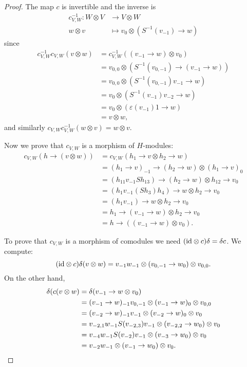 \begin{proof}
The map $c$ is invertible and the inverse is 
\begin{align*}
c_{V,W}^{-1}:W\otimes V & \to V\otimes W\\
w\otimes v & \mapsto v_{0}\otimes(S^{-1}(v_{-1})\to w)
\end{align*}
since
\begin{align*}
c_{V,W}^{-1}c_{V,W}(v\otimes w) & =c_{V,W}^{-1}((v_{-1}\to w)\otimes v_{0})\\
 & =v_{0,0}\otimes(S^{-1}(v_{0,-1})\to(v_{-1}\to w))\\
 & =v_{0,0}\otimes(S^{-1}(v_{0,-1})v_{-1}\to w)\\
 & =v_{0}\otimes(S^{-1}(v_{-1})v_{-2}\to w)\\
 & =v_{0}\otimes(\varepsilon(v_{-1})1\to w)\\
 & =v\otimes w,
\end{align*}
and similarly $c_{V,W}c_{V,W}^{-1}(w\otimes v)=w\otimes v$. 

Now we prove that $c_{V,W}$ is a morphism of $H$-modules: 
\begin{align*}
c_{V,W}(h\rightarrow (v\otimes w))&=c_{V,W}(h_1\rightarrow v\otimes h_2\rightarrow w)\\
&=(h_1\rightarrow v)_{-1}\rightarrow(h_2\rightarrow w)\otimes(h_1\rightarrow v)_0\\
&=(h_{11}v_{-1}Sh_{13})\rightarrow(h_2\rightarrow w)\otimes h_{12}\rightarrow v_0\\
&=(h_1v_{-1}(Sh_3)h_4)\rightarrow w\otimes h_2\rightarrow v_0\\
&=(h_1v_{-1})\rightarrow w\otimes h_2\rightarrow v_0\\
&=h_1\rightarrow(v_{-1}\rightarrow w)\otimes h_2\rightarrow v_0\\
&=h\rightarrow((v_{-1}\rightarrow w)\otimes v_0).
\end{align*}

To prove that $c_{V,W}$ is a morphism of comodules we need $(\mathrm{id}\otimes
c)\delta=\delta c$.  We compute:
\[
(\mathrm{id}\otimes c)\delta(v\otimes w)=v_{-1}w_{-1}\otimes (v_{0,-1}\rightarrow w_0)\otimes v_{0,0}.
\]
On the other hand,
\begin{align*}
\delta(c(v\otimes w)&=\delta(v_{-1}\rightarrow w\otimes v_0)\\
&=(v_{-1}\rightarrow w)_{-1}v_{0,-1}\otimes(v_{-1}\rightarrow w)_0\otimes v_{0,0}\\
&=(v_{-2}\rightarrow w)_{-1}v_{-1}\otimes (v_{-2}\rightarrow w)_0\otimes v_0\\
&=v_{-2,1}w_{-1}S(v_{-2,3})v_{-1}\otimes(v_{-2,2}\rightarrow w_0)\otimes v_0\\
&=v_{-4}w_{-1}S(v_{-2})v_{-1}\otimes (v_{-3}\rightarrow w_0)\otimes v_0\\
&=v_{-2}w_{-1}\otimes(v_{-1}\rightarrow w_0)\otimes v_0.\qedhere
\end{align*}
\end{proof}

